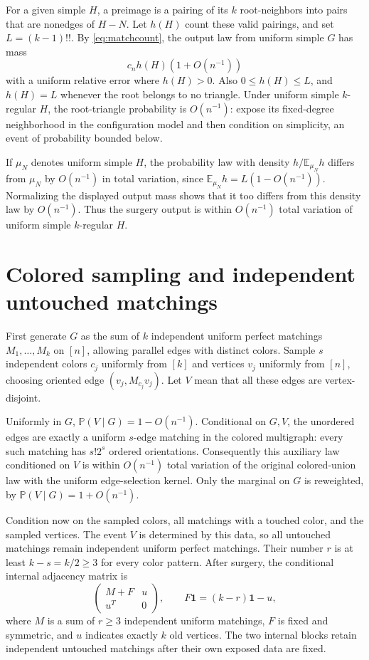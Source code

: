 \documentclass[11pt]{article}
\newcommand{\one}{\mathbf1}
\newcommand{\E}{\mathbb E}
\newcommand{\Prob}{\mathbb P}
\begin{document}
For a given simple $H$, a preimage is a pairing of its $k$ root-neighbors into pairs that are nonedges of $H-N$. Let $h(H)$ count these valid pairings, and set $L=(k-1)!!$. By \eqref{eq:matchcount}, the output law from uniform simple $G$ has mass
\[
 c_n h(H)(1+O(n^{-1}))
\]
with a uniform relative error where $h(H)>0$. Also $0\le h(H)\le L$, and $h(H)=L$ whenever the root belongs to no triangle. Under uniform simple $k$-regular $H$, the root-triangle probability is $O(n^{-1})$: expose its fixed-degree neighborhood in the configuration model and then condition on simplicity, an event of probability bounded below.

If $\mu_N$ denotes uniform simple $H$, the probability law with density $h/\E_{\mu_N}h$ differs from $\mu_N$ by $O(n^{-1})$ in total variation, since $\E_{\mu_N}h=L(1-O(n^{-1}))$. Normalizing the displayed output mass shows that it too differs from this density law by $O(n^{-1})$. Thus the surgery output is within $O(n^{-1})$ total variation of uniform simple $k$-regular $H$.

\section{Colored sampling and independent untouched matchings}
First generate $G$ as the sum of $k$ independent uniform perfect matchings $M_1,\ldots,M_k$ on $[n]$, allowing parallel edges with distinct colors. Sample $s$ independent colors $c_j$ uniformly from $[k]$ and vertices $v_j$ uniformly from $[n]$, choosing oriented edge $(v_j,M_{c_j}v_j)$. Let $V$ mean that all these edges are vertex-disjoint.

Uniformly in $G$, $\Prob(V\mid G)=1-O(n^{-1})$. Conditional on $G,V$, the unordered edges are exactly a uniform $s$-edge matching in the colored multigraph: every such matching has $s!2^s$ ordered orientations. Consequently this auxiliary law conditioned on $V$ is within $O(n^{-1})$ total variation of the original colored-union law with the uniform edge-selection kernel. Only the marginal on $G$ is reweighted, by $\Prob(V\mid G)=1+O(n^{-1})$.

Condition now on the sampled colors, all matchings with a touched color, and the sampled vertices. The event $V$ is determined by this data, so all untouched matchings remain independent uniform perfect matchings. Their number $r$ is at least $k-s=k/2\ge3$ for every color pattern. After surgery, the conditional internal adjacency matrix is
\begin{equation}\label{eq:border}
 \begin{pmatrix}M+F&u\\u^T&0\end{pmatrix},\qquad
 F\one=(k-r)\one-u,
\end{equation}
where $M$ is a sum of $r\ge3$ independent uniform matchings, $F$ is fixed and symmetric, and $u$ indicates exactly $k$ old vertices. The two internal blocks retain independent untouched matchings after their own exposed data are fixed.
\end{document}

